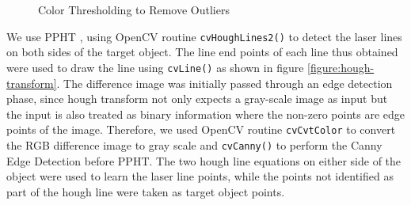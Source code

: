 \begin{figure}[ht!]
\centering
{} \quad
{} \hfill
\caption{Color Thresholding to Remove Outliers}
\label{figure:color-thres}
\end{figure}

We use \ac{PPHT} \cite{kiryati:1991}, \cite{matas:2000} using OpenCV routine
\texttt{cvHoughLines2()} to detect the laser lines on both sides of the target
object. The line end points of each line thus obtained were used to draw the
line using \texttt{cvLine()} as shown in figure \ref{figure:hough-transform}.
The difference image was initially passed through an edge detection phase,
since hough transform not only expects a gray-scale image as input but the
input is also treated as binary information where the non-zero points are edge
points of the image. Therefore, we used OpenCV routine \texttt{cvCvtColor} to
convert the RGB difference image to gray scale and \texttt{cvCanny()} to
perform the Canny Edge Detection \cite{canny:1986} before \ac{PPHT}. The two
hough line equations on either side of the object were used to learn the laser
line points, while the points not identified as part of the hough line were
taken as target object points.

